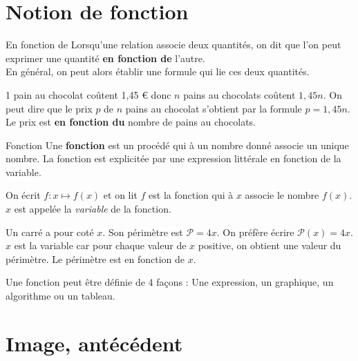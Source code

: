 \begin{pageCours}




\section{Notion de fonction}


\begin{DefT}{En fonction de}
Lorsqu'une relation associe deux quantités, on dit que l'on peut exprimer une quantité \textbf{en fonction de} l'autre. \\ En général, on peut alors établir une formule qui lie ces deux quantités.
\end{DefT}

\begin{Ex}
1 pain au chocolat coûtent 1,45 \euro{} donc $n$ pains au chocolats coûtent $1,45n$. On peut dire que le prix $p$ de $n$ pains au chocolat s'obtient par la formule $p=1,45n$. Le prix est \textbf{en fonction du} nombre de pains au chocolats.
\end{Ex}


\begin{DefT}{Fonction}
Une \textbf{fonction}  est un procédé qui à un nombre donné associe un unique nombre. La fonction est explicitée par une expression littérale en fonction de la variable.
 
On écrit $f : x \longmapsto f(x)$ et on lit $f$ est la fonction qui à $x$ associe le nombre $f(x)$. $x$ est appelée la \textit{variable}  de la fonction.
\end{DefT}


\begin{Ex}
Un carré a pour coté $x$. Son périmètre est $\mathscr P = 4x$. On préfère écrire $\mathscr{P}(x) = 4x$. $x$ est la variable car pour chaque valeur de $x$ positive, on obtient une valeur du périmètre. Le périmètre est en fonction de $x$.
\end{Ex}


\begin{Rq} 
Une fonction peut être définie de 4 façons : Une expression, un graphique, un algorithme ou un tableau.
\end{Rq}


 
\section{Image, antécédent}



\end{pageCours}

